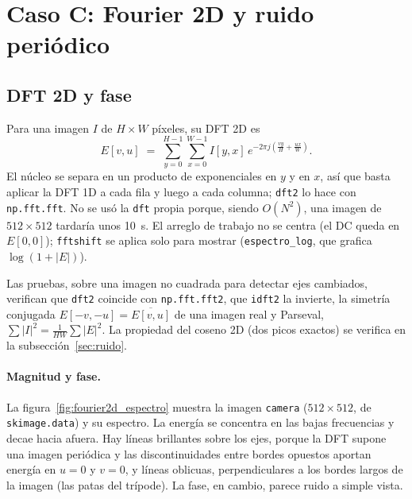 
\section{Caso C: Fourier 2D y ruido periódico}
\label{sec:fourier2d}

\subsection{DFT 2D y fase}
\label{sec:dft2}

Para una imagen $I$ de $H\times W$ píxeles, su DFT 2D es
\begin{equation}
  E[v,u] \;=\; \sum_{y=0}^{H-1}\sum_{x=0}^{W-1} I[y,x]\,
  e^{-2\pi j\left(\frac{vy}{H}+\frac{ux}{W}\right)} .
  \label{eq:dft2}
\end{equation}
El núcleo se separa en un producto de exponenciales en $y$ y en $x$, así que basta aplicar la DFT 1D a
cada fila y luego a cada columna; \texttt{dft2} lo hace con \texttt{np.fft.fft}. No se usó la
\texttt{dft} propia porque, siendo $O(N^2)$, una imagen de $512\times512$ tardaría unos 10~s. El arreglo de trabajo no
se centra (el DC queda en $E[0,0]$); \texttt{fftshift} se aplica solo para mostrar
(\texttt{espectro\_log}, que grafica $\log(1+|E|)$).

Las pruebas, sobre una imagen no cuadrada para detectar ejes cambiados, verifican que \texttt{dft2}
coincide con \texttt{np.fft.fft2}, que \texttt{idft2} la invierte, la simetría conjugada
$E[-v,-u]=\overline{E[v,u]}$ de una imagen real y Parseval,
$\sum|I|^2=\frac{1}{HW}\sum|E|^2$. La propiedad del coseno 2D (dos picos exactos) se verifica en la
subsección~\ref{sec:ruido}.

\paragraph{Magnitud y fase.}
La figura~\ref{fig:fourier2d_espectro} muestra la imagen \texttt{camera} ($512\times512$, de
\texttt{skimage.data}) y su espectro. La energía se concentra en las bajas frecuencias y decae hacia
afuera. Hay líneas brillantes sobre los ejes, porque la DFT supone una imagen periódica y las
discontinuidades entre bordes opuestos aportan energía en $u=0$ y $v=0$, y líneas oblicuas,
perpendiculares a los bordes largos de la imagen (las patas del trípode). La fase, en cambio, parece
ruido a simple vista.

